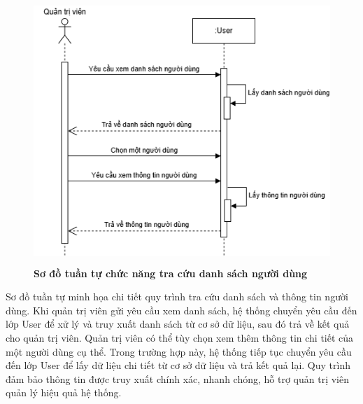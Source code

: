 \begin{figure}[H]
	\centering
	\includegraphics[width=12cm,height=10cm]{Images/sequence/user/getAllUser.drawio.png}
	\caption[Sơ đồ tuần tự chức năng tra cứu danh sách người dùng]{\bfseries \fontsize{12pt}{0pt}
		\selectfont Sơ đồ tuần tự chức năng tra cứu danh sách người dùng}
	\label{sequence_get_all_user} %
\end{figure}
Sơ đồ tuần tự minh họa chi tiết quy trình tra cứu danh sách và thông tin người dùng. Khi quản trị viên gửi yêu cầu xem danh sách, hệ thống chuyển yêu cầu đến lớp User để xử lý và truy xuất danh sách từ cơ sở dữ liệu, sau đó trả về kết quả cho quản trị viên.
Quản trị viên có thể tùy chọn xem thêm thông tin chi tiết của một người dùng cụ thể. Trong trường hợp này, hệ thống tiếp tục chuyển yêu cầu đến lớp User để lấy dữ liệu chi tiết từ cơ sở dữ liệu và trả kết quả lại.
Quy trình đảm bảo thông tin được truy xuất chính xác, nhanh chóng, hỗ trợ quản trị viên quản lý hiệu quả hệ thống.

